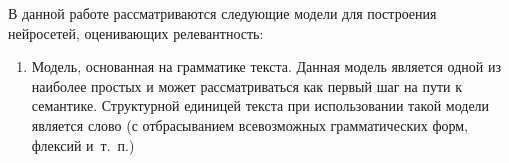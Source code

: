 В данной работе рассматриваются следующие модели для построения нейросетей, оценивающих релевантность:
\begin{enumerate}[1)]
    \item Модель, основанная на грамматике текста. Данная модель является одной из наиболее простых и может
    рассматриваться как первый шаг на пути к семантике. Структурной единицей текста при использовании такой модели
    является слово (с отбрасыванием всевозможных грамматических форм, флексий и~т.~п.)
\end{enumerate}